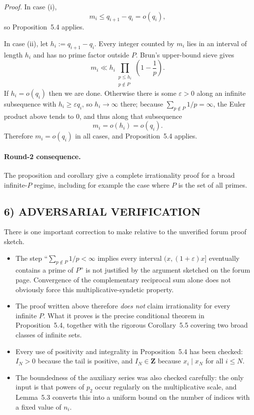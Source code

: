 \emph{Proof.}
In case (i),
\[
m_i\le q_{i+1}-q_i=o(q_i),
\]
so Proposition~5.4 applies.

In case (ii), let $h_i:=q_{i+1}-q_i$. Every integer counted by $m_i$ lies in an interval of length $h_i$ and has no prime factor outside $P$. Brun's upper-bound sieve gives
\[
m_i\ll h_i\prod_{\substack{p\le h_i\\ p\notin P}}\left(1-\frac1p\right).
\]
If $h_i=o(q_i)$ then we are done. Otherwise there is some $\varepsilon>0$ along an infinite subsequence with $h_i\ge \varepsilon q_i$, so $h_i\to\infty$ there; because $\sum_{p\notin P}1/p=\infty$, the Euler product above tends to $0$, and thus along that subsequence
\[
m_i=o(h_i)=o(q_i).
\]
Therefore $m_i=o(q_i)$ in all cases, and Proposition~5.4 applies. 

\paragraph{Round-2 consequence.}
The proposition and corollary give a complete irrationality proof for a broad infinite-$P$ regime, including for example the case where $P$ is the set of all primes.

\subsection*{6) ADVERSARIAL VERIFICATION}
There is one important correction to make relative to the unverified forum proof sketch.

\begin{itemize}
\item The step ``$\sum_{p\notin P}1/p<\infty$ implies every interval $(x,(1+\varepsilon)x]$ eventually contains a prime of $P$'' is not justified by the argument sketched on the forum page. Convergence of the complementary reciprocal sum alone does not obviously force this multiplicative-syndetic property.
\item The proof written above therefore \emph{does not} claim irrationality for every infinite $P$. What it proves is the precise conditional theorem in Proposition~5.4, together with the rigorous Corollary~5.5 covering two broad classes of infinite sets.
\item Every use of positivity and integrality in Proposition~5.4 has been checked: $I_N>0$ because the tail is positive, and $I_N\in\mathbf Z$ because $x_i\mid x_N$ for all $i\le N$.
\item The boundedness of the auxiliary series was also checked carefully: the only input is that powers of $p_2$ occur regularly on the multiplicative scale, and Lemma~5.3 converts this into a uniform bound on the number of indices with a fixed value of $n_i$.
\end{itemize}

